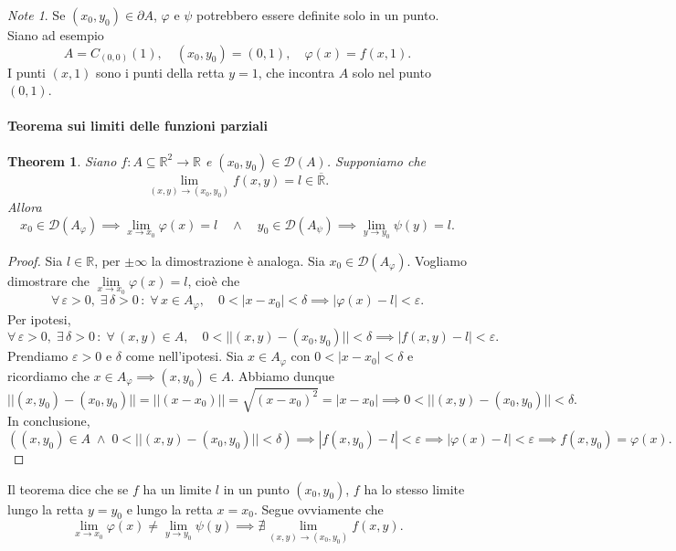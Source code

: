 \documentclass{article}
\theoremstyle{plain}
\newtheorem{thm}{Theorem}[section]
\theoremstyle{definition}
\theoremstyle{remark}
\newtheorem{note}{Note}
\begin{document}
\vspace{10pt}

\begin{note}
    Se $(x_0,y_0)\in \partial A$, $\varphi$ e $\psi$ potrebbero essere definite solo in un punto.
    Siano ad esempio
    \[A=C_{(0,0)}(1),\quad (x_0,y_0)=(0,1),\quad \varphi(x)=f(x,1).\]
    I punti $(x,1)$ sono i punti della retta $y=1$, che incontra $A$ solo nel punto $(0,1)$.
\end{note}

\vspace{10pt}

\paragraph{Teorema sui limiti delle funzioni parziali}
\begin{bxthm}
\begin{thm}
    Siano $f:A\subseteq\mathbb{R}^2\to\mathbb{R}$ e $(x_0,y_0)\in\mathcal{D}(A)$.
    Supponiamo che 
    \[\lim_{(x,y)\to(x_0,y_0)}f(x,y)=l\in\overline{\mathbb{R}}.\]
    Allora 
    \[x_0\in\mathcal{D}(A_\varphi)\implies \lim_{x\to x_0}\varphi(x)=l\quad\land\quad y_0\in\mathcal{D}(A_\psi)\implies \lim_{y\to y_0}\psi(y)=l.\]
\end{thm}
\end{bxthm}
\begin{proof}
    Sia $l\in\mathbb{R}$, per $\pm\infty$ la dimostrazione è analoga. 
    Sia $x_0\in\mathcal{D}(A_\varphi)$. Vogliamo dimostrare che $\lim\limits_{x\to x_0}\varphi(x)=l$,
    cioè che
    \[\forall\,\varepsilon>0,\;\exists\,\delta>0\,:\;\forall\, x\in A_\varphi,\quad 0<|x-x_0|<\delta\implies|\varphi(x)-l|<\varepsilon.\]
    Per ipotesi, 
    \[\forall\,\varepsilon>0,\;\exists\,\delta>0\,:\;\forall\,(x,y)\in A,\quad 0<||(x,y)-(x_0,y_0)||<\delta\implies|f(x,y)-l|<\varepsilon.\]
    Prendiamo $\varepsilon>0$ e $\delta$ come nell'ipotesi. 
    Sia $x\in A_\varphi$ con $0<|x-x_0|<\delta$ e ricordiamo che $x\in A_\varphi\implies(x,y_0)\in A$.
    Abbiamo dunque 
    \[|| (x,y_0)-(x_0,y_0) ||=||(x-x_0)||=\sqrt{(x-x_0)^2}=|x-x_0|\implies 0<||(x,y)-(x_0,y_0)||<\delta.\]
    In conclusione,
    \[((x,y_0)\in A \;\land\; 0<|| (x,y)-(x_0,y_0) ||<\delta)\implies |f(x,y_0)-l|<\varepsilon\implies |\varphi(x)-l|<\varepsilon\implies f(x,y_0)=\varphi(x).\]
\end{proof}

\vspace{10pt}

Il teorema dice che se $f$ ha un limite $l$ in un punto $(x_0,y_0)$, $f$ ha lo stesso limite lungo la retta $y=y_0$ e lungo la retta $x=x_0$.
Segue ovviamente che 
\[\lim_{x\to x_0}\varphi(x)\neq\lim_{y\to y_0}\psi(y)\implies\nexists\lim_{(x,y)\to(x_0,y_0)}f(x,y).\]
\end{document}
